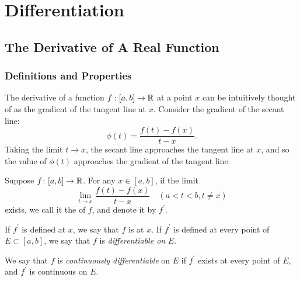 \chapter{Differentiation}\label{chap:differentiation}
\section{The Derivative of A Real Function}
\subsection{Definitions and Properties}
The derivative of a function $f:[a,b]\to\mathbb R$ at a point $x$ can be intuitively thought of as the gradient of the tangent line at $x$.
Consider the gradient of the secant line:
\[\phi(t)=\frac{f(t)-f(x)}{t-x}.\]
Taking the limit $t\to x$, the secant line approaches the tangent line at $x$, and so the value of $\phi(t)$ approaches the gradient of the tangent line.

\begin{figure}[H]
\centering
{}
\end{figure}

\begin{definition}[Derivative]
Suppose $f\colon [a,b]\to\mathbb R$. For any $x\in[a,b]$, if the limit
\begin{equation}\label{eqn:derivative}
\lim_{t\to x}\frac{f(t)-f(x)}{t-x}\quad(a<t<b,t\neq x)
\end{equation}
exists, we call it the  of $f$, and denote it by $f^\prime$. 

If $f^\prime$ is defined at $x$, we say that $f$ is  at $x$. If $f^\prime$ is defined at every point of $E\subset[a,b]$, we say that $f$ is \emph{differentiable on} $E$.

We say that $f$ is \emph{continuously differentiable} on $E$ if $f^\prime$ exists at every point of $E$, and $f^\prime$ is continuous on $E$.
\end{definition}

